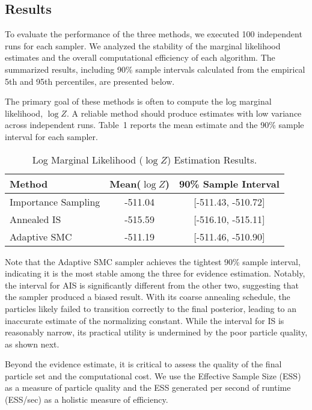 \documentclass[a4paper, 12pt]{article}
\begin{document}
    \subsection{Results}
    
    To evaluate the performance of the three methods, we executed 100 independent runs for each sampler. We analyzed the stability of the marginal likelihood estimates and the overall computational efficiency of each algorithm. The summarized results, including 90\% sample intervals calculated from the empirical 5th and 95th percentiles, are presented below.

    The primary goal of these methods is often to compute the log marginal likelihood, $\log Z$. A reliable method should produce estimates with low variance across independent runs. Table~1 reports the mean estimate and the 90\% sample interval for each sampler.

    \begin{table}[h!]
        \centering
        \begin{tabular}{l c c}
            \hline
            \textbf{Method} & \textbf{Mean($\log Z$)} & \textbf{90\% Sample Interval} \\
            \hline
            Importance Sampling    & -511.04 & [-511.43, -510.72] \\
            Annealed IS           & -515.59 & [-516.10, -515.11] \\
            Adaptive SMC       & -511.19 & [-511.46, -510.90] \\
            \hline
            \end{tabular}
       \caption{Log Marginal Likelihood ($\log Z$) Estimation Results.}
    \end{table}

    
    Note that the Adaptive SMC sampler achieves the tightest 90\% sample interval, indicating it is the most stable among the three for evidence estimation. Notably, the interval for AIS is significantly different from the other two, suggesting that the sampler produced a biased result. With its coarse annealing schedule, the particles likely failed to transition correctly to the final posterior, leading to an inaccurate estimate of the normalizing constant. While the interval for IS is reasonably narrow, its practical utility is undermined by the poor particle quality, as shown next.

    Beyond the evidence estimate, it is critical to assess the quality of the final particle set and the computational cost. We use the Effective Sample Size (ESS) as a measure of particle quality and the ESS generated per second of runtime (ESS/sec) as a holistic measure of efficiency.
\end{document}
